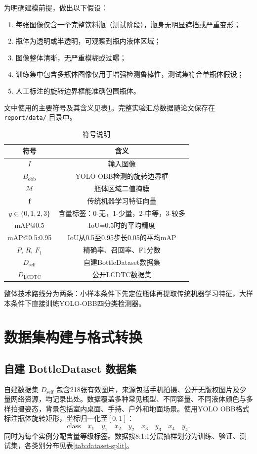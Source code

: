 \documentclass[withoutpreface,bwprint]{cumcmthesis}
\begin{document}
为明确建模前提，做出以下假设：
\begin{enumerate}
    \item 每张图像仅含一个完整饮料瓶（测试阶段），瓶身无明显遮挡或严重变形；
    \item 瓶体为透明或半透明，可观察到瓶内液体区域；
    \item 图像整体清晰，无严重模糊或过曝；
    \item 训练集中包含多瓶体图像仅用于增强检测鲁棒性，测试集符合单瓶体假设；
    \item 人工标注的旋转边界框能准确包围瓶体。
\end{enumerate}

文中使用的主要符号及其含义见表\ref{tab:symbols}。完整实验汇总数据随论文保存在 \texttt{report/data/} 目录中。
\begin{table}[htbp]
    \centering
    \caption{符号说明}
    \label{tab:symbols}
    \begin{tabular}{c|c}
    \toprule
    符号 & 含义 \\
    \midrule
    $I$ & 输入图像 \\
    $B_{\text{obb}}$ & YOLO OBB检测的旋转边界框 \\
    $\mathcal{M}$ & 瓶体区域二值掩膜 \\
    $\mathbf{f}$ & 传统机器学习特征向量 \\
    $y\in\{0,1,2,3\}$ & 含量标签：0-无，1-少量，2-中等，3-较多 \\
    mAP@0.5 & IoU=0.5时的平均精度 \\
    mAP@0.5:0.95 & IoU从0.5至0.95步长0.05的平均mAP \\
    $P$, $R$, $F_1$ & 精确率、召回率、F1分数 \\
    $D_{\text{self}}$ & 自建BottleDataset数据集 \\
    $D_{\text{LCDTC}}$ & 公开LCDTC数据集 \\
    \bottomrule
    \end{tabular}
\end{table}

整体技术路线分为两条：小样本条件下先定位瓶体再提取传统机器学习特征，大样本条件下直接训练YOLO-OBB四分类检测器。

\section{数据集构建与格式转换}
\subsection{自建 BottleDataset 数据集}
自建数据集 $D_{\text{self}}$ 包含218张有效图片，来源包括手机拍摄、公开无版权图片及少量网络资源，均记录出处。数据覆盖多种常见瓶型、不同容量、不同液体颜色与多样拍摄姿态，背景包括室内桌面、手持、户外和地面场景。使用YOLO OBB格式标注瓶体旋转矩形，坐标归一化至$[0,1]$：
\[
\text{class}\quad x_1\quad y_1\quad x_2\quad y_2\quad x_3\quad y_3\quad x_4\quad y_4 .
\]
同时为每个实例分配含量等级标签。数据按8:1:1分层抽样划分为训练、验证、测试集，各类别分布见表\ref{tab:dataset-split}。
\end{document}
